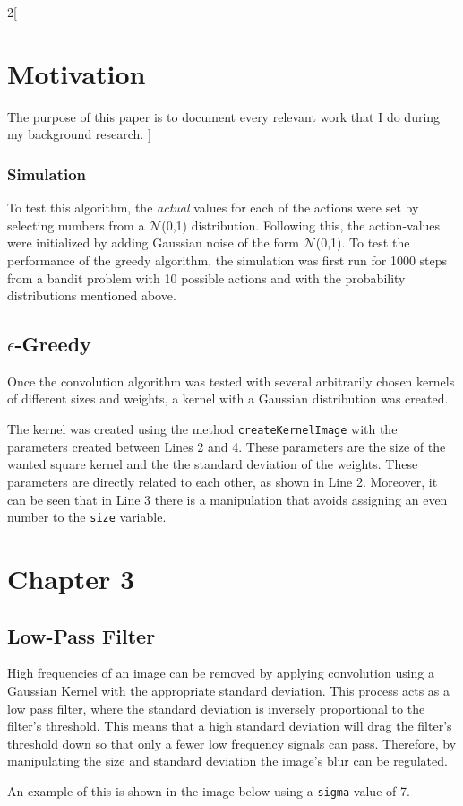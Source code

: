 \documentclass[a4paper]{article}
\begin{document}
\begin{multicols}{2}[
		\section*{Motivation}
		The purpose of this paper is to document every relevant work that I do during my background research.
		]
		\subsubsection{Simulation}
		To test this algorithm, the \textit{actual} values for each of the actions were set by selecting numbers from a $\mathcal{N}$(0,1) distribution. Following this, the action-values were initialized by adding Gaussian noise of the form $\mathcal{N}$(0,1). To test the performance of the greedy algorithm, the simulation was first run for 1000 steps from a bandit problem with 10 possible actions and with the probability distributions mentioned above.
		
		
		
		\subsection{$\epsilon$-Greedy}
		Once the convolution algorithm was tested with several arbitrarily chosen kernels of different sizes and weights, a kernel with a Gaussian distribution was created. 
		
		The kernel was created using the method \texttt{createKernelImage} with the parameters created between Lines 2 and 4. These parameters are the size of the wanted square kernel and the the standard deviation of the weights. These parameters are directly related to each other, as shown in Line 2. Moreover, it can be seen that in Line 3 there is a manipulation that avoids assigning an even number to the \texttt{size} variable. 
		
		
		\section{Chapter 3}
		\subsection{Low-Pass Filter}
		High frequencies of an image can be removed by applying convolution using a Gaussian Kernel with the appropriate standard deviation. This process acts as a low pass filter, where the standard deviation is inversely proportional to the filter's threshold. This means that a high standard deviation will drag the filter's threshold down so that only a fewer low frequency signals can pass. Therefore, by manipulating the size and standard deviation the image's blur can be regulated.
		
		An example of this is shown in the image below using a \texttt{sigma} value of 7.
		


\end{multicols}
\end{document}
